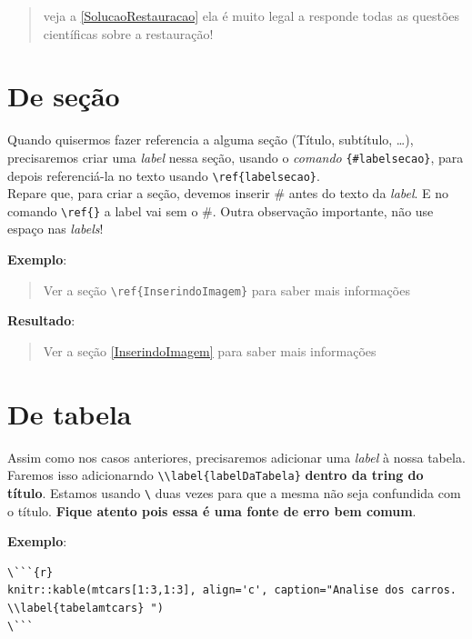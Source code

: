 \documentclass[]{book}
\begin{document}
\begin{quote}
veja a \autoref{SolucaoRestauracao} ela é muito legal a responde todas as questões científicas sobre a restauração!
\end{quote}

\hypertarget{de-seuxe7uxe3o}{%
\section{De seção}\label{de-seuxe7uxe3o}}

Quando quisermos fazer referencia a alguma seção (Título, subtítulo, \ldots{}), precisaremos criar uma \emph{label} nessa seção, usando o \emph{comando} \texttt{\{\#labelsecao\}}, para depois referenciá-la no texto usando \texttt{\textbackslash{}ref\{labelsecao\}}.\\
Repare que, para criar a seção, devemos inserir \# antes do texto da \emph{label}. E no comando \texttt{\textbackslash{}ref\{\}} a label vai sem o \#. Outra observação importante, não use espaço nas \emph{labels}!

\textbf{Exemplo}:

\begin{quote}
Ver a seção \texttt{\textbackslash{}ref\{InserindoImagem\}} para saber mais informações
\end{quote}

\textbf{Resultado}:

\begin{quote}
Ver a seção \ref{InserindoImagem} para saber mais informações
\end{quote}

\hypertarget{de-tabela}{%
\section{De tabela}\label{de-tabela}}

Assim como nos casos anteriores, precisaremos adicionar uma \emph{label} à nossa tabela. Faremos isso adicionarndo \texttt{\textbackslash{}\textbackslash{}label\{labelDaTabela\}} \textbf{dentro da tring do título}. Estamos usando \texttt{\textbackslash{}} duas vezes para que a mesma não seja confundida com o título. \textbf{Fique atento pois essa é uma fonte de erro bem comum}.

\textbf{Exemplo}:

\begin{verbatim}
\```{r}
knitr::kable(mtcars[1:3,1:3], align='c', caption="Analise dos carros. \\label{tabelamtcars} ")
\```
\end{verbatim}
\end{document}
